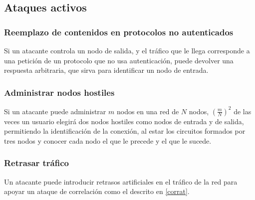 \documentclass[
  a4paper,
  12pt,
  spanish,
]{scrartcl}
\begin{document}
\subsection{Ataques activos}

\subsubsection{Reemplazo de contenidos en protocolos no autenticados}

Si un atacante controla un nodo de salida, y el tráfico que le llega corresponde
a una petición de un protocolo que no usa autenticación, puede devolver una
respuesta arbitraria, que sirva para identificar un nodo de entrada.

\subsubsection{Administrar nodos hostiles}

Si un atacante puede administrar $m$ nodos en una red de $N$ nodos,
$\left(\frac{m}{N}\right)^2$ de las veces un usuario elegirá dos nodos hostiles
como nodos de entrada y de salida, permitiendo la identificación de la conexión,
al estar los circuitos formados por tres nodos y conocer cada nodo el que le
precede y el que le sucede.

\subsubsection{Retrasar tráfico}

Un atacante puede introducir retrasos artificiales en el tráfico de la red para
apoyar un ataque de correlación como el descrito en \ref{corrat}.


\newpage
\printbibliography
\end{document}
